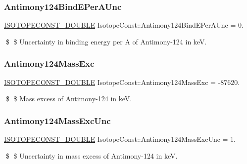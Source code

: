 \subsubsection{\texorpdfstring{Antimony124\+Bind\+E\+Per\+A\+Unc}{Antimony124BindEPerAUnc}}
{\footnotesize\ttfamily \mbox{\hyperlink{group___isotope_const-_macros_ga8f45a7272ce02c0b4c65c44636ed719a}{I\+S\+O\+T\+O\+P\+E\+C\+O\+N\+S\+T\+\_\+\+D\+O\+U\+B\+LE}} Isotope\+Const\+::\+Antimony124\+Bind\+E\+Per\+A\+Unc = 0.}

\$ \$ Uncertainty in binding energy per A of Antimony-\/124 in keV. \mbox{\label{group___isotope_const-_antimony-_sb124_ga8901017f4d3a1ee30bf61e57eed1fd89}} 
\subsubsection{\texorpdfstring{Antimony124\+Mass\+Exc}{Antimony124MassExc}}
{\footnotesize\ttfamily \mbox{\hyperlink{group___isotope_const-_macros_ga8f45a7272ce02c0b4c65c44636ed719a}{I\+S\+O\+T\+O\+P\+E\+C\+O\+N\+S\+T\+\_\+\+D\+O\+U\+B\+LE}} Isotope\+Const\+::\+Antimony124\+Mass\+Exc = -\/87620.}

\$ \$ Mass excess of Antimony-\/124 in keV. \mbox{\label{group___isotope_const-_antimony-_sb124_gadeaebf5507e5a4c37119f481e3fa290d}} 
\subsubsection{\texorpdfstring{Antimony124\+Mass\+Exc\+Unc}{Antimony124MassExcUnc}}
{\footnotesize\ttfamily \mbox{\hyperlink{group___isotope_const-_macros_ga8f45a7272ce02c0b4c65c44636ed719a}{I\+S\+O\+T\+O\+P\+E\+C\+O\+N\+S\+T\+\_\+\+D\+O\+U\+B\+LE}} Isotope\+Const\+::\+Antimony124\+Mass\+Exc\+Unc = 1.}

\$ \$ Uncertainty in mass excess of Antimony-\/124 in keV. \mbox{\label{group___isotope_const-_antimony-_sb124_ga7c837e39f16f818763818d9813b1d2dd}} 
